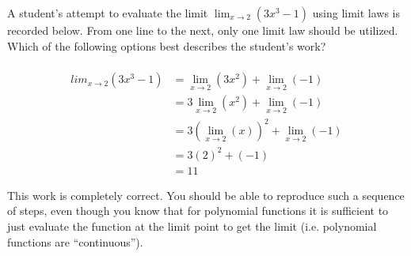 \documentclass{ximera}
\author{Steven Gubkin}
\begin{document}
\begin{exercise}

	A student's attempt to evaluate the limit $\lim_{x \to 2} \left( 3x^3-1 \right)$ using limit laws is recorded below.  From one line to the next, only one limit law should be utilized.  Which of the following options best describes the student's work?
	
	\begin{align*}
		\\lim_{x \to 2} \left( 3x^3-1 \right) &= \lim_{x \to 2} \left( 3x^2\right) + \lim_{x \to 2} \left( -1 \right)\\
		&= 3 \lim_{x \to 2} \left( x^2\right) + \lim_{x \to 2} \left( -1 \right)\\
		&= 3 \left( \lim_{x \to 2} \left( x\right) \right)^2 + \lim_{x \to 2} \left( -1 \right)\\
		&=3 \left( 2 \right)^2 + \left( -1 \right)\\
		&= 11
	\end{align*}
	
	\begin{multipleChoice}
	\end{multipleChoice}
	
	\begin{feedback}
		This work is completely correct.  You should be able to reproduce such a sequence of steps, even though you know that for polynomial functions it is sufficient to just evaluate the function at the limit point to get the limit (i.e. polynomial functions are ``continuous'').
	\end{feedback}
	
\end{exercise}
\end{document}
